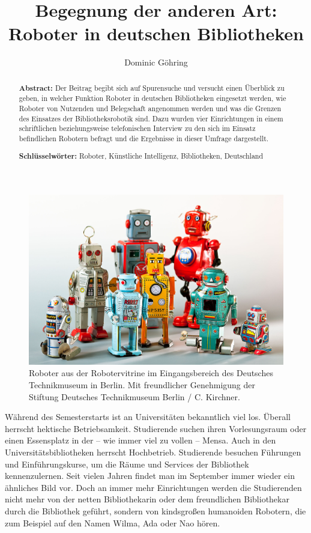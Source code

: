 \documentclass[a4paper,
fontsize=11pt,
oneside,
numbers=noperiodatend,
parskip=half-,
bibliography=totoc,
final
]{scrartcl}
\title{\LARGE{Begegnung der anderen Art: Roboter in deutschen Bibliotheken}}%
\author{Dominic Göhring} %
\date{}
\begin{document}
\maketitle
\thispagestyle{fancyplain} 

\begin{abstract}
\noindent
\textbf{Abstract:} Der Beitrag begibt sich auf Spurensuche und versucht einen Überblick zu
geben, in welcher Funktion Roboter in deutschen Bibliotheken eingesetzt
werden, wie Roboter von Nutzenden und Belegschaft angenommen werden und
was die Grenzen des Einsatzes der Bibliotheksrobotik sind. Dazu wurden
vier Einrichtungen in einem schriftlichen beziehungsweise telefonischen
Interview zu den sich im Einsatz befindlichen Robotern befragt und die
Ergebnisse in dieser Umfrage dargestellt.

\noindent\textbf{Schlüsselwörter:} Roboter, Künstliche Intelligenz, Bibliotheken,
Deutschland
\end{abstract}


\begin{figure}
\centering
\includegraphics[width=.5\textwidth]{img/Robotervitrine.jpg}
\caption{Roboter aus der Robotervitrine im Eingangsbereich des Deutsches
Technikmuseum in Berlin. Mit freundlicher Genehmigung der Stiftung
Deutsches Technikmuseum Berlin / C. Kirchner.}
\end{figure}

Während des Semesterstarts ist an Universitäten bekanntlich viel los.
Überall herrscht hektische Betriebsamkeit. Studierende suchen ihren
Vorlesungsraum oder einen Essensplatz in der -- wie immer viel zu vollen
-- Mensa. Auch in den Universitätsbibliotheken herrscht Hochbetrieb.
Studierende besuchen Führungen und Einführungskurse, um die Räume und
Services der Bibliothek kennenzulernen. Seit vielen Jahren findet man im
September immer wieder ein ähnliches Bild vor. Doch an immer mehr
Einrichtungen werden die Studierenden nicht mehr von der netten
Bibliothekarin oder dem freundlichen Bibliothekar durch die Bibliothek
geführt, sondern von kindsgroßen humanoiden Robotern, die zum Beispiel
auf den Namen Wilma, Ada oder Nao hören.
\end{document}
